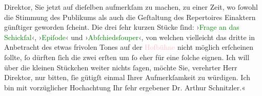                     Direktor, Sie jetzt auf dieſelben aufmerkſam zu machen, zu einer Zeit, wo ſowohl
                    die Stimmung des Publikums als auch die Geſtaltung des Repertoires Einaktern
                    günſtiger geworden ſcheint. Die drei ſehr kurzen Stücke ſind: ›\textcolor{green}{Frage an das Schickſal}{}\ledrightnote{\textcolor{green}{Die Frage an das Schicksal}}‹, ›\textcolor{green}{Epiſode}{}\ledrightnote{\textcolor{green}{Episode}}‹ und ›\textcolor{green}{Abſchiedsſouper}{}\ledrightnote{\textcolor{green}{Abschiedssouper}}‹, von
                    welchen vielleicht das dritte in Anbetracht des etwas frivolen Tones auf der \textcolor{pink}{Hofbühne}{} nicht möglich
                    erſcheinen ſollte, ſo dürften ſich die zwei erſten um ſo eher für eine ſolche
                    eignen. Ich will über die kleinen Stückchen weiter nichts ſagen, möchte Sie,
                    verehrter Herr Direktor, nur bitten, ſie gütigſt einmal Ihrer Aufmerkſamkeit zu
                    würdigen. Ich bin mit vorzüglicher Hochachtung Ihr ſehr ergebener Dr. Arthur
                    Schnitzler.«\pend
           \endnumbering{}  
      